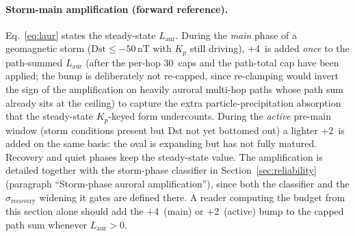 \documentclass[11pt,a4paper]{article}
\newcommand{\SI}[2]{#1\,\text{#2}}
\newcommand{\dB}{\text{dB}}
\begin{document}
\paragraph{Storm-main amplification (forward reference).}
Eq.~\ref{eq:laur} states the steady-state $L_{\text{aur}}$.  During
the \emph{main} phase of a geomagnetic storm
($\text{Dst}\le-50\,\text{nT}$ with $K_p$ still driving),
\SI{+4}{\dB} is added \emph{once} to the path-summed
$L_{\text{aur}}$ (after the per-hop \SI{30}{\dB} caps and the
path-total cap have been applied; the bump is deliberately not
re-capped, since re-clamping would invert the sign of the
amplification on heavily auroral multi-hop paths whose path sum
already sits at the ceiling) to capture the extra
particle-precipitation absorption that the steady-state
$K_p$-keyed form undercounts.  During the \emph{active} pre-main
window (storm conditions present but Dst not yet bottomed out)
a lighter \SI{+2}{\dB} is added on the same basis: the oval is
expanding but has not fully matured.  Recovery and quiet phases
keep the steady-state value.  The amplification is detailed
together with the storm-phase classifier in
Section~\ref{sec:reliability}
(paragraph ``Storm-phase auroral amplification''), since both
the classifier and the $\sigma_{\text{recovery}}$ widening it
gates are defined there.  A reader computing the budget from
this section alone should add the \SI{+4}{\dB} (main) or
\SI{+2}{\dB} (active) bump to the capped path sum whenever
$L_{\text{aur}} > 0$.
\end{document}
